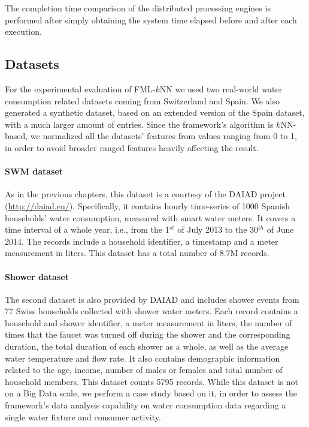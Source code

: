 The completion time comparison of the distributed processing engines is performed after simply obtaining the system time elapsed before and after each execution.

\subsection{Datasets}
\label{subsec:datasets}
For the experimental evaluation of FML-$k$NN we used two real-world water consumption related datasets coming from Switzerland and Spain. We also generated a synthetic dataset, based on an extended version of the Spain dataset, with a much larger amount of entries. Since the framework's algorithm is $k$NN-based, we normalized all the datasets' features from values ranging from 0 to 1, in order to avoid broader ranged features heavily affecting the result. 

\paragraph{SWM dataset}
\label{par:alicante}
As in the previous chapters, this dataset is a courtesy of the DAIAD project (\url{http://daiad.eu/}). Specifically, it contains hourly time-series of 1000 Spanish households' water consumption, measured with smart water meters. It covers a time interval of a whole year, i.e., from the 1$^{st}$ of July 2013 to the 30$^{th}$ of June 2014. The records include a household identifier, a timestamp and a meter measurement in liters. This dataset has a total number of 8.7M records.

\paragraph{Shower dataset}
\label{par:amphiro}
The second dataset is also provided by DAIAD and includes shower events from 77 Swiss households collected with shower water meters. Each record contains a household and shower identifier, a meter measurement in liters, the number of times that the faucet was turned off during the shower and the corresponding duration, the total duration of each shower as a whole, as well as the average water temperature and flow rate. It also contains demographic information related to the age, income, number of males or females and total number of household members. This dataset counts 5795 records. While this dataset is not on a Big Data scale, we perform a case study based on it, in order to assess the framework's data analysis capability on water consumption data regarding a single water fixture and consumer activity.

